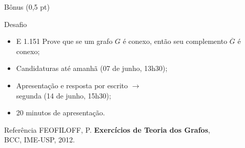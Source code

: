 \documentclass[xcolor=dvipsnames,table]{beamer}
\begin{document}
	\begin{frame}{Bônus (0,5 pt)}
		\begin{block}{Desafio}
			\begin{itemize}
				\item {E 1.151} Prove que se um grafo $G$ é conexo, então seu complemento $\overline{G}$ é conexo; 
                \item Candidaturas até amanhã (07 de junho, 13h30); 
                \item Apresentação e resposta por escrito $\rightarrow$ \\segunda (14 de junho, 15h30); 
                \item 20 minutos de apresentação.
			\end{itemize}
		\end{block}
        \begin{block}{Referência}
			FEOFILOFF, P. {\bf Exercícios de Teoria dos Grafos}, \\
			BCC, IME-USP, 2012. 
		\end{block}	
	\end{frame}
	
	\begin{frame}
		\titlepage
	\end{frame}
	
\end{document}
